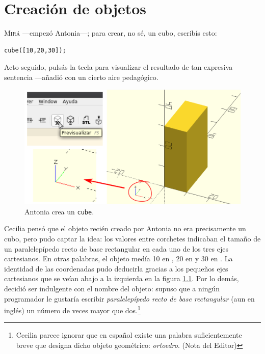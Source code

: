 \chapter{Creación de objetos}


\lettrine[ante=\raisebox{-1.5ex}{\Large ---},lines=2]{M}{irá} ---empezó
Antonia---; para crear, no sé, un cubo, escribís esto:



\begin{lstlisting}[numbers=none]
cube([10,20,30]);    
\end{lstlisting}


\guillemotright Acto seguido, pulsás la tecla  para
visualizar el resultado de tan expresiva sentencia ---añadió con un
cierto aire pedagógico.


\begin{figure}[ht]
  \centering
  \includegraphics[width=.85\textwidth,valign=c]{imagenes/cubo-f5-flecha}
  \caption{Antonia crea un \lstinline!cube!.}
  \label{fig:cubo}
\end{figure}
 

Cecilia pensó que el objeto recién creado por Antonia no era
precisamente un cubo, pero pudo captar la idea: los valores entre
corchetes indicaban el tamaño de un paralelepípedo recto de base
rectangular en cada uno de los tres ejes cartesianos. En otras
palabras, el objeto medía 10 en , 20 en  y 30 en
. La identidad de las coordenadas pudo deducirla gracias a
los pequeños ejes cartesianos que se veían abajo a la izquierda en la
figura \ref{fig:cubo}. Por lo demás, decidió ser indulgente con el
nombre del objeto: supuso que a ningún programador le gustaría
escribir \emph{paralelepípedo recto de base rectangular} (aun en
inglés) un número de veces mayor que dos.\footnote{Cecilia parece
  ignorar que en español existe una palabra suficientemente breve que
  designa dicho objeto geométrico: \emph{ortoedro}. (Nota del Editor)}

